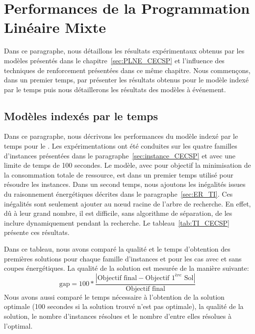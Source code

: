 \section{Performances de la Programmation Linéaire Mixte}
\label{sec:expe_PLNE}
Dans ce paragraphe, nous détaillons les résultats expérimentaux
obtenus par les modèles présentés dans le
chapitre~\ref{sec:PLNE_CECSP} et l'influence des techniques de
renforcement présentées dans ce même chapitre. Nous commençons, dans
un premier temps, par présenter les résultats obtenus pour le modèle
indexé par le temps puis nous détaillerons les résultats des modèles à événement.

\subsection{Modèles indexés par le temps}
Dans ce paragraphe, nous décrivons les performances du modèle indexé
par le temps pour le \CECSP. Les expérimentations ont été conduites
sur les quatre familles d'instances présentées dans le
paragraphe~\ref{sec:instance_CECSP} et avec une limite de temps de 100
secondes. Le modèle, avec pour objectif la minimisation de la
consommation totale de ressource, est dans un premier temps utilisé
pour résoudre les instances. Dans un second temps, nous ajoutons les
inégalités issues du raisonnement énergétiques décrites dans le
paragraphe~\ref{sec:ER_TI}. Ces inégalités sont seulement ajouter au
n\oe ud racine de l'arbre de recherche. En effet, dû à leur grand
nombre, il est difficile, sans algorithme de séparation, de les
inclure dynamiquement pendant la recherche. Le
tableau~\ref{tab:TI_CECSP} présente ces résultats.

Dans ce tableau, nous avons comparé la qualité et le temps d'obtention
des premières solutions pour chaque famille d'instances et pour les
cas avec et sans coupes énergétiques. La qualité de la solution est
mesurée de la manière suivante: 
\[
  \text{gap}=100*\frac{|\text{Objectif final} - \text{Objectif } 1^{ère} \text{  Sol}|}{\text{Objectif final}}
\]
Nous avons aussi comparé le temps nécessaire à l'obtention de la
solution optimale (100 secondes si la solution trouvé n'est pas
optimale), la qualité de la solution, le nombre d'instances résolues
et le nombre d'entre elles résolues à l'optimal.

